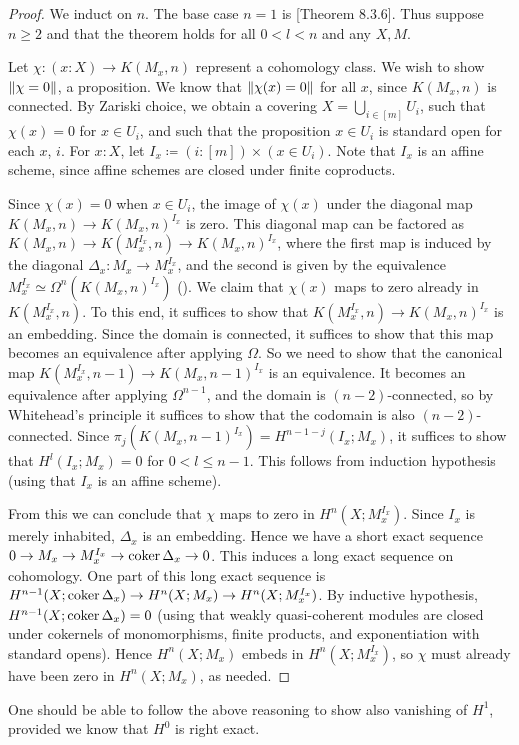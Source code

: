 \begin{proof}
We induct on $n$. The base case $n = 1$ is \cite{draft}[Theorem 8.3.6].
Thus suppose $n \ge 2$ and that the theorem holds for all $0 < l < n$ and
any $X,M$.

Let $\chi : (x : X) \to K(M_x, n)$ represent a cohomology class.
We wish to show $\lVert \chi = 0 \rVert$, a proposition.
We know that $\lVert \chi(x) = 0 \rVert$ for all $x$, since $K(M_x,n)$ is connected.
By Zariski choice, we obtain a covering
$X = \bigcup_{i \in [m]} U_i$,
such that $\chi(x) = 0$ for $x \in U_i$, and
such that the proposition $x \in U_i$ is standard open for each $x$, $i$.
For $x : X$, let $I_x \coloneqq (i : [m]) \times (x \in U_i)$.
Note that $I_x$ is an affine scheme, since affine schemes are closed under finite
coproducts.

Since $\chi(x) = 0$ when $x \in U_i$, the image of $\chi(x)$ under the diagonal
map $K(M_x,n) \to K(M_x,n)^{I_x}$ is zero.
This diagonal map can be factored as $K(M_x,n) \to K(M_x^{I_x},n) \to K(M_x,n)^{I_x}$,
where the first map is induced by the diagonal $\Delta_x : M_x \to M_x^{I_x}$,
and the second is given by the equivalence
$M_x^{I_x} \simeq \Omega^n(K(M_x,n)^{I_x})$ ().
We claim that $\chi(x)$ maps to zero already in $K(M_x^{I_x},n)$.
To this end, it suffices to show that
$K(M_x^{I_x},n) \to K(M_x,n)^{I_x}$ is an embedding.
Since the domain is connected, it suffices to show that this map becomes
an equivalence after applying $\Omega$.
So we need to show that the canonical map
$K(M_x^{I_x},n-1) \to K(M_x,n-1)^{I_x}$ is an equivalence.
It becomes an equivalence after applying $\Omega^{n-1}$, and
the domain is $(n-2)$-connected, so by Whitehead's principle it suffices 
to show that the codomain is also $(n-2)$-connected.
Since $\pi_j(K(M_x,n-1)^{I_x}) = H^{n-1-j}(I_x;M_x)$,
it suffices to show that $H^l(I_x;M_x) = 0$ for
$0 < l \le n-1$. This follows from induction hypothesis
(using that $I_x$ is an affine scheme).

From this we can conclude that $\chi$ maps to zero in
$H^n(X;M_x^{I_x})$.
Since $I_x$ is merely inhabited, $\Delta_x$ is an embedding.
Hence we have a short exact sequence
$0 \to M_x \to M_x^{I_x} \to \operatorname{coker} \Delta_x \to 0$.
This induces a long exact sequence on cohomology.
One part of this long exact sequence is
$H^{n-1}(X;\operatorname{coker}\Delta_x) \to H^n(X;M_x) \to H^n(X;M_x^{I_x})$.
By inductive hypothesis, $H^{n-1}(X;\operatorname{coker}\Delta_x) = 0$
(using that weakly quasi-coherent modules are closed under
 cokernels of monomorphisms, finite products, and exponentiation
 with standard opens).
Hence $H^n(X;M_x)$ embeds in $H^n(X;M_x^{I_x})$, so
$\chi$ must already have been zero in $H^n(X;M_x)$, as needed.
\end{proof}

One should be able to follow the above reasoning to show also vanishing of
$H^1$, provided we know that $H^0$ is right exact.

